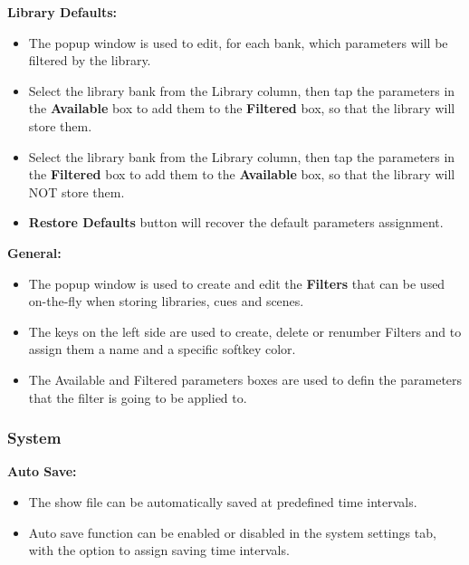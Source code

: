 \documentclass[
]{article}
\providecommand{\tightlist}{%
  \setlength{\itemsep}{0pt}\setlength{\parskip}{0pt}}
\begin{document}
\textbf{Library Defaults:}

\begin{itemize}
\tightlist
\item
  The popup window is used to edit, for each bank, which parameters will be filtered by the library.
\end{itemize}

\begin{itemize}
\item
  Select the library bank from the Library column, then tap the parameters in the \textbf{Available} box to add them to the \textbf{Filtered} box, so that the library will store them.
\item
  Select the library bank from the Library column, then tap the parameters in the \textbf{Filtered} box to add them to the \textbf{Available} box, so that the library will NOT store them.
\item
  \textbf{Restore Defaults} button will recover the default parameters assignment.
\end{itemize}

\textbf{General:}

\begin{itemize}
\tightlist
\item
  The popup window is used to create and edit the \textbf{Filters} that can be used on-the-fly when storing libraries, cues and scenes.
\end{itemize}

\begin{itemize}
\item
  The keys on the left side are used to create, delete or renumber Filters and to assign them a name and a specific softkey color.
\item
  The Available and Filtered parameters boxes are used to defin the parameters that the filter is going to be applied to.
\end{itemize}

\hypertarget{system}{%
\subsubsection{System}\label{system}}

\textbf{Auto Save:}

\begin{itemize}
\item
  The show file can be automatically saved at predefined time intervals.
\item
  Auto save function can be enabled or disabled in the system settings tab, with the option to assign saving time intervals.
\end{itemize}
\end{document}
